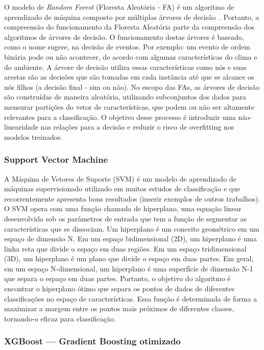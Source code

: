 O modelo de \textit{Random Forest} (Floresta Aleatória - FA) é um algoritmo de aprendizado de máquina composto por múltiplas árvores de decisão~\cite{breiman2001random}. Portanto, a compreensão do funcionamento da Floresta Aleatória parte da compreensão dos algoritmos de árvores de decisão. O funcionamento destas árvores é baseado, como o nome sugere, na decisão de eventos. Por exemplo: um evento de ordem binária pode ou não acontecer, de acordo com algumas características do clima e do ambiente. A árvore de decisão utiliza essas características como nós e suas arestas são as decisões que são tomadas em cada instância até que se alcance os nós filhos (a decisão final - sim ou não). No escopo das FAs, as árvores de decisão são construídas de maneira aleatória, utilizando subconjuntos dos dados para mensurar partições do vetor de características, que podem ou não ser altamente relevantes para a classificação. O objetivo desse processo é introduzir uma não-linearidade nas relações para a decisão e reduzir o risco de overfitting nos modelos treinados.

\subsubsection{Support Vector Machine}

A Máquina de Vetores de Suporte (SVM) é um modelo de aprendizado de máquinas supervisionado utilizado em muitos estudos de classificação e que recorrentemente apresenta bons resultados (inserir exemplos de outros trabalhos). O SVM opera com uma função chamada de hiperplano, uma equação linear desenvolvida sob os parâmetros de entrada que tem a função de segmentar as características que se dissociam. Um hiperplano é um conceito geométrico em um espaço de dimensão N. Em um espaço bidimensional (2D), um hiperplano é uma linha reta que divide o espaço em duas regiões. Em um espaço tridimensional (3D), um hiperplano é um plano que divide o espaço em duas partes. Em geral, em um espaço N-dimensional, um hiperplano é uma superfície de dimensão N-1 que separa o espaço em duas partes. Portanto, o objetivo do algoritmo é encontrar o hiperplano ótimo que separa os pontos de dados de diferentes classificações no espaço de características. Essa função é determinada de forma a maximizar a margem entre os pontos mais próximos de diferentes classes, tornando-o eficaz para classificação.

\subsubsection{XGBoost --- Gradient Boosting otimizado}
\label{subsec:fund_xgboost}

